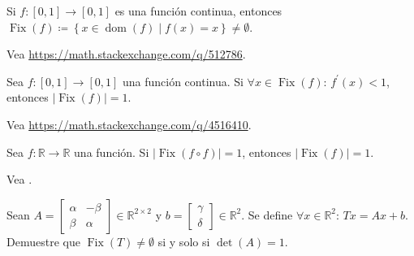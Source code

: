 \question

Si
\begin{math}
	f\colon\left[0,1\right]\to
	\left[0,1\right]
\end{math}
es una función continua, entonces
\begin{math}
	\operatorname{Fix}\left(f\right)\coloneqq
	\left\{x\in\operatorname{dom}\left(f\right)\mid
	f\left(x\right)=x\right\}\neq
	\emptyset
\end{math}.

\begin{solutionordottedlines}
	Vea \url{https://math.stackexchange.com/q/512786}.
\end{solutionordottedlines}


\question

Sea
\begin{math}
	f\colon\left[0,1\right]\to
	\left[0,1\right]
\end{math}
una función continua.
Si $\forall x\in\operatorname{Fix}\left(f\right)$: $f^{\prime}\left(x\right)<1$,
entonces
\begin{math}
	\left|\operatorname{Fix}\left(f\right)\right|=
	1
\end{math}.

\begin{solutionordottedlines}
	Vea \url{https://math.stackexchange.com/q/4516410}.
\end{solutionordottedlines}

\question

Sea
\begin{math}
	f\colon\mathbb{R}\to\mathbb{R}
\end{math}
una función.
Si $\left|\operatorname{Fix}\left(f\circ f\right)\right|=1$, entonces
$\left|\operatorname{Fix}\left(f\right)\right|=1$.

\begin{solutionordottedlines}
	Vea \url{}.
\end{solutionordottedlines}

\question

Sean
\begin{math}
	A=
	\begin{bmatrix}
		\alpha & -\beta \\
		\beta  & \alpha
	\end{bmatrix}\in
	\mathbb{R}^{2\times 2}
\end{math}
y
\begin{math}
	b=
	\begin{bmatrix}
		\gamma \\
		\delta
	\end{bmatrix}\in
	\mathbb{R}^{2}
\end{math}.
Se define $\forall x\in\mathbb{R}^{2}$: $Tx=Ax+b$.
Demuestre que
$\operatorname{Fix}\left(T\right)\neq\emptyset$ si y solo si $\det\left(A\right)=1$.

